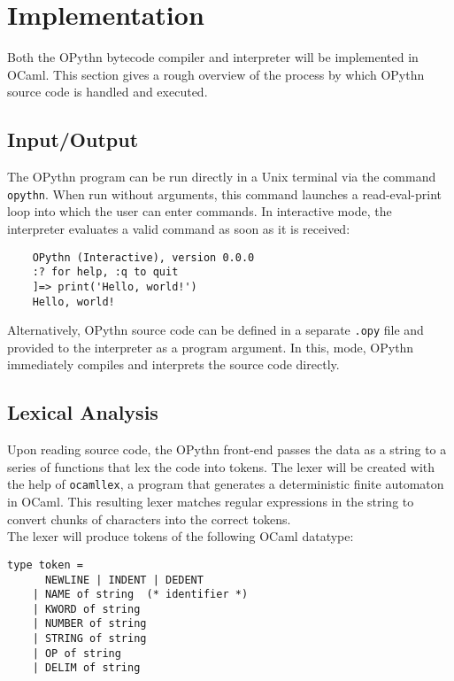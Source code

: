 \documentclass[11pt, twoside]{article}
\begin{document}
\section{Implementation}
Both the OPythn bytecode compiler and interpreter will be implemented in OCaml. This section gives a rough overview of the process by which OPythn source code is handled and executed.
    \subsection{Input/Output}
    The OPythn program can be run directly in a Unix terminal via the command \texttt{opythn}. When run without arguments, this command launches a read-eval-print loop into which the user can enter commands. In interactive mode, the interpreter evaluates a valid command as soon as it is received:
    \begin{lstlisting}
    OPythn (Interactive), version 0.0.0
    :? for help, :q to quit
    ]=> print('Hello, world!')
    Hello, world!
    \end{lstlisting}
    Alternatively, OPythn source code can be defined in a separate \texttt{.opy} file and provided to the interpreter as a program argument. In this, mode, OPythn immediately compiles and interprets the source code directly.
    \subsection{Lexical Analysis}
    Upon reading source code, the OPythn front-end passes the data as a string to a series of functions that lex the code into tokens. The lexer will be created with the help of \texttt{ocamllex}, a program that generates a deterministic finite automaton in OCaml. This resulting lexer matches regular expressions in the string to convert chunks of characters into the correct tokens.\\
    \indent The lexer will produce tokens of the following OCaml datatype:
    \begin{lstlisting}[language=caml]
    type token =
      NEWLINE | INDENT | DEDENT
    | NAME of string  (* identifier *)
    | KWORD of string
    | NUMBER of string
    | STRING of string
    | OP of string
    | DELIM of string
    \end{lstlisting}
\end{document}
